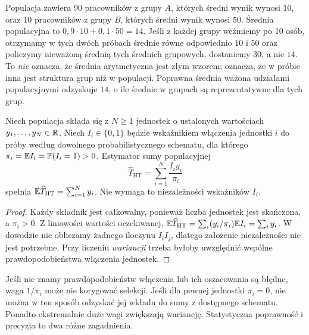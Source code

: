 \begin{przyklad}\label{ex:selection}
Populacja zawiera 90 pracowników z grupy $A$, których średni wynik wynosi $10$, oraz 10 pracowników z grupy $B$, których średni wynik wynosi $50$. Średnia populacyjna to $0{,}9\cdot10+0{,}1\cdot50=14$. Jeśli z każdej grupy weźmiemy po 10 osób, otrzymamy w tych dwóch próbach średnie równe odpowiednio $10$ i $50$ oraz policzymy nieważoną średnią tych średnich grupowych, dostaniemy $30$, a nie $14$. To \emph{nie} oznacza, że średnia arytmetyczna jest złym wzorem; oznacza, że w próbie inna jest struktura grup niż w populacji. Poprawna średnia ważona udziałami populacyjnymi odzyskuje $14$, o ile średnie w grupach są reprezentatywne dla tych grup.
\end{przyklad}

\begin{twierdzenie}\label{thm:HT}
Niech populacja składa się z $N\ge1$ jednostek o ustalonych wartościach $y_1,\ldots,y_N\in\mathbb R$. Niech $I_i\in\{0,1\}$ będzie wskaźnikiem włączenia jednostki $i$ do próby według dowolnego probabilistycznego schematu, dla którego $\pi_i=\mathbb E I_i=\mathbb P(I_i=1)>0$. Estymator sumy populacyjnej
\[
\widehat T_{\mathrm{HT}}=\sum_{i=1}^N\frac{I_i y_i}{\pi_i}
\]
spełnia $\mathbb E\widehat T_{\mathrm{HT}}=\sum_{i=1}^Ny_i$. Nie wymaga to niezależności wskaźników $I_i$.
\end{twierdzenie}
\begin{proof}
Każdy składnik jest całkowalny, ponieważ liczba jednostek jest skończona, a $\pi_i>0$. Z liniowości wartości oczekiwanej,
$\mathbb E\widehat T_{\mathrm{HT}}=\sum_i(y_i/\pi_i)\mathbb E I_i=\sum_i y_i$. W dowodzie nie obliczamy żadnego iloczynu $I_iI_j$, dlatego założenie niezależności nie jest potrzebne. Przy liczeniu \emph{wariancji} trzeba byłoby uwzględnić wspólne prawdopodobieństwa włączenia jednostek.
\end{proof}

\begin{uwaga}
Jeśli nie znamy prawdopodobieństw włączenia lub ich oszacowania są błędne, waga $1/\pi_i$ może nie korygować selekcji. Jeśli dla pewnej jednostki $\pi_i=0$, nie można w ten sposób odzyskać jej wkładu do sumy z dostępnego schematu. Ponadto ekstremalnie duże wagi zwiększają wariancję. Statystyczna poprawność i precyzja to dwa różne zagadnienia.
\end{uwaga}

